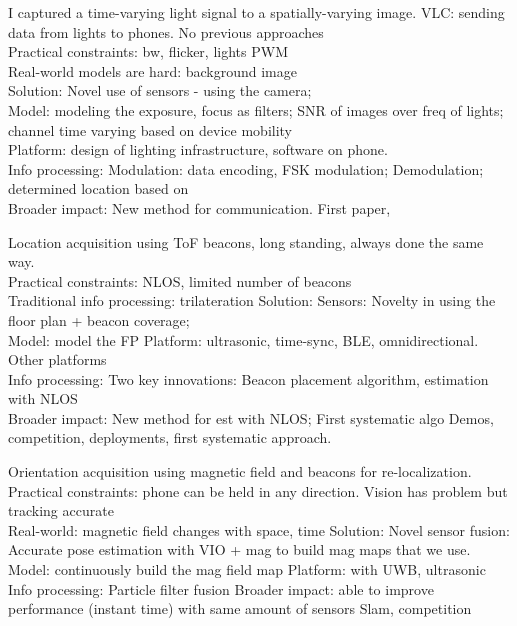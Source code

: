 \documentclass[10pt]{article}
\begin{document}

I captured a time-varying light signal to a spatially-varying image.  
VLC: sending data from lights to phones. No previous approaches\\
Practical constraints: bw, flicker, lights PWM\\
Real-world models are hard: background image\\
Solution:
Novel use of sensors - using the camera;\\
Model: modeling the exposure, focus as filters; SNR of images over freq of lights; channel time varying based on device mobility\\
Platform: design of lighting infrastructure, software on phone.\\
Info processing: Modulation: data encoding, FSK modulation; Demodulation; determined location based on \\
Broader impact:
New method for communication.
First paper, 

Location acquisition using ToF beacons, long standing, always done the same way.\\
Practical constraints: NLOS, limited number of beacons\\
Traditional info processing: trilateration 
Solution:
Sensors: Novelty in using the floor plan + beacon coverage;\\
Model: model the FP
Platform: ultrasonic, time-sync, BLE, omnidirectional. Other platforms\\
Info processing: Two key innovations: Beacon placement algorithm, estimation with NLOS\\
Broader impact:
New method for est with NLOS;
First systematic algo 
Demos, competition, deployments, first systematic approach.

Orientation acquisition using magnetic field and beacons for re-localization.\\
Practical constraints: phone can be held in any direction. Vision has problem but tracking accurate\\
Real-world: magnetic field changes with space, time
Solution:
Novel sensor fusion: Accurate pose estimation with VIO + mag to build mag maps that we use.\\
Model: continuously build the mag field map
Platform: with UWB, ultrasonic
Info processing: 
Particle filter fusion
Broader impact: 
able to improve performance (instant time) with same amount of sensors
Slam, competition
\end{document}

